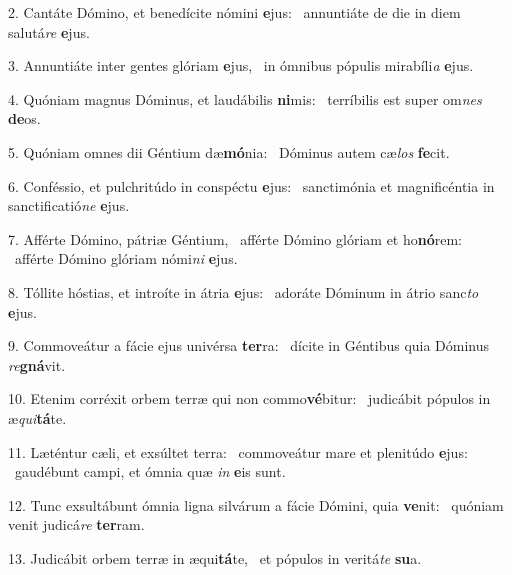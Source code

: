 2. Cantáte Dómino, et benedícite nómini \textbf{e}jus: \ast\  annuntiáte de die in diem salutá\textit{re} \textbf{e}jus.\

3. Annuntiáte inter gentes glóriam \textbf{e}jus, \ast\  in ómnibus pópulis mirabíli\textit{a} \textbf{e}jus.\

4. Quóniam magnus Dóminus, et laudábilis \textbf{ni}mis: \ast\  terríbilis est super om\textit{nes} \textbf{de}os.\

5. Quóniam omnes dii Géntium dæ\textbf{mó}nia: \ast\  Dóminus autem cæ\textit{los} \textbf{fe}cit.\

6. Conféssio, et pulchritúdo in conspéctu \textbf{e}jus: \ast\  sanctimónia et magnificéntia in sanctificatió\textit{ne} \textbf{e}jus.\

7. Afférte Dómino, pátriæ Géntium, \dag\  afférte Dómino glóriam et ho\textbf{nó}rem: \ast\  afférte Dómino glóriam nómi\textit{ni} \textbf{e}jus.\

8. Tóllite hóstias, et introíte in átria \textbf{e}jus: \ast\  adoráte Dóminum in átrio sanc\textit{to} \textbf{e}jus.\

9. Commoveátur a fácie ejus univérsa \textbf{ter}ra: \ast\  dícite in Géntibus quia Dóminus \textit{re}\textbf{gná}vit.\

10. Etenim corréxit orbem terræ qui non commo\textbf{vé}bitur: \ast\  judicábit pópulos in æ\textit{qui}\textbf{tá}te.\

11. Læténtur cæli, et exsúltet terra: \dag\  commoveátur mare et plenitúdo \textbf{e}jus: \ast\  gaudébunt campi, et ómnia quæ \textit{in} \textbf{e}is sunt.\

12. Tunc exsultábunt ómnia ligna silvárum a fácie Dómini, quia \textbf{ve}nit: \ast\  quóniam venit judicá\textit{re} \textbf{ter}ram.\

13. Judicábit orbem terræ in æqui\textbf{tá}te, \ast\  et pópulos in veritá\textit{te} \textbf{su}a.\


